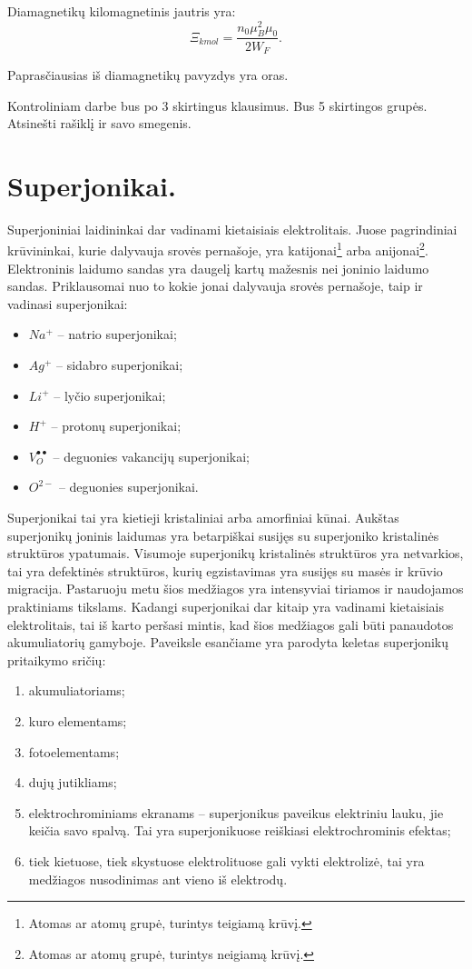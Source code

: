 Diamagnetikų kilomagnetinis jautris yra:
\begin{equation*}
  \Xi_{kmol} = \frac{n_{0}\mu_{B}^{2}\mu_{0}}{2W_{F}}.
\end{equation*}

Paprasčiausias iš diamagnetikų pavyzdys yra oras.

Kontroliniam darbe bus po 3 skirtingus klausimus. Bus 5 skirtingos
grupės. Atsinešti rašiklį ir savo smegenis.

\section{Superjonikai.}

\newcommand{\ovacancy}{V_{O}^{\bullet \bullet}}

Superjoniniai laidininkai dar vadinami kietaisiais elektrolitais. Juose
pagrindiniai krūvininkai, kurie dalyvauja srovės pernašoje, yra
katijonai\footnote{Atomas ar atomų grupė, turintys teigiamą krūvį.}
arba anijonai\footnote{Atomas ar atomų grupė, turintys neigiamą
krūvį.}. Elektroninis laidumo sandas yra daugelį kartų mažesnis
nei joninio laidumo sandas. Priklausomai nuo to kokie jonai dalyvauja
srovės pernašoje, taip ir vadinasi superjonikai:
\begin{itemize}
  \item $Na^{+}$ – natrio superjonikai;
  \item $Ag^{+}$ – sidabro superjonikai;
  \item $Li^{+}$ – lyčio superjonikai;
  \item $H^{+}$ – protonų superjonikai;
  \item $\ovacancy$ – deguonies vakancijų superjonikai;
  \item $O^{2-}$ – deguonies superjonikai.
\end{itemize}

Superjonikai tai yra kietieji kristaliniai arba amorfiniai kūnai.
Aukštas superjonikų joninis laidumas yra betarpiškai susijęs su
superjoniko kristalinės struktūros ypatumais. Visumoje superjonikų
kristalinės struktūros yra netvarkios, tai yra defektinės struktūros,
kurių egzistavimas yra susijęs su masės ir krūvio migracija. Pastaruoju
metu šios medžiagos yra intensyviai tiriamos ir naudojamos praktiniams
tikslams. Kadangi superjonikai dar kitaip yra vadinami kietaisiais
elektrolitais, tai iš karto peršasi mintis, kad šios medžiagos
gali būti panaudotos akumuliatorių gamyboje. Paveiksle esančiame
 yra parodyta keletas superjonikų pritaikymo sričių:
\begin{enumerate}
  \item akumuliatoriams;
  \item kuro elementams;
  \item fotoelementams;
  \item dujų jutikliams;
  \item elektrochrominiams ekranams – superjonikus paveikus elektriniu
    lauku, jie keičia savo spalvą. Tai yra superjonikuose reiškiasi
    elektrochrominis efektas;
  \item tiek kietuose, tiek skystuose elektrolituose gali vykti
    elektrolizė, tai yra medžiagos nusodinimas ant vieno iš
    elektrodų.
\end{enumerate}

